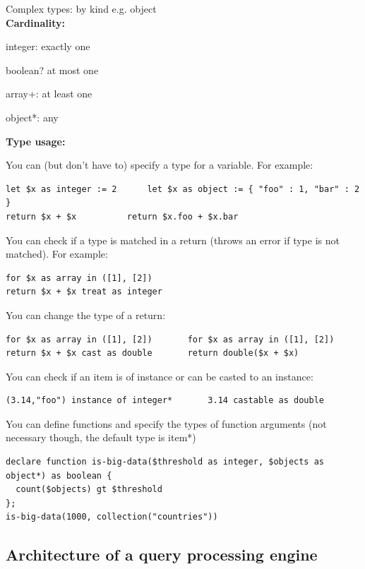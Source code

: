 \documentclass[11pt,oneside,a4paper]{article}
\begin{document}
{Complex types: by kind e.g. object\\

\textbf{Cardinality:}
\begin{compactitem}
\item integer: exactly one
\item boolean? at most one
\item array+: at least one
\item object*: any\\
\end{compactitem}

\textbf{Type usage:} 

You can (but don't have to) specify a type for a variable. For example:
\begin{lstlisting}
let $x as integer := 2		let $x as object := { "foo" : 1, "bar" : 2 }
return $x + $x			return $x.foo + $x.bar
\end{lstlisting}

You can check if a type is matched in a return (throws an error if type is not matched). For example:
\begin{lstlisting}
for $x as array in ([1], [2])
return $x + $x treat as integer
\end{lstlisting}

You can change the type of a return:
\begin{lstlisting}
for $x as array in ([1], [2])		for $x as array in ([1], [2])
return $x + $x cast as double		return double($x + $x)
\end{lstlisting}

You can check if an item is of instance or can be casted to an instance:
\begin{lstlisting}
(3.14,"foo") instance of integer*		3.14 castable as double
\end{lstlisting}

You can define functions and specify the types of function arguments (not necessary though, the default type is item*)
\begin{lstlisting}[basicstyle=\small]
declare function is-big-data($threshold as integer, $objects as object*) as boolean {
  count($objects) gt $threshold
};
is-big-data(1000, collection("countries"))
\end{lstlisting}

\subsection{Architecture of a query processing engine}

}
\end{document}
